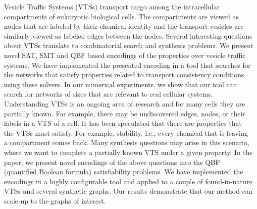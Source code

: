 Vesicle Traffic Systems (VTSs) transport cargo among the intracellular compartments of eukaryotic biological cells.
%
The compartments are viewed as nodes that are labeled by their chemical identity and the transport vesicles are similarly viewed as labeled edges between the nodes.
%
Several interesting questions about VTSs translate to combinatorial search and synthesis problems. 
%
We present novel SAT, SMT and QBF based encodings of the properties over vesicle traffic systems.
%
We have implemented the presented encoding in a tool that searches for the networks that satisfy properties related to transport consistency conditions using these solvers. 
%
In our numerical experiments, we show that our tool can search for networks of sizes that are relevant to real cellular systems.
%
Understanding VTSs is an ongoing area of
research and for many cells they are partially known. 
%
For example, there
may be undiscovered edges, nodes, or their labels in a VTS of a cell. 
%
It has been speculated that there are properties that the VTSs must satisfy.
For example, stability, i.e., every chemical that is leaving a compartment
comes back. 
%
Many synthesis questions may arise in this scenario, where
we want to complete a partially known VTS under a given property.
%
In the paper, we present novel encodings of the above questions into
the QBF (quantified Boolean formula) satisfiability problems. 
%
We have implemented the encodings in a highly configurable tool and applied to a
couple of found-in-nature VTSs and several synthetic graphs.
%
Our results demonstrate that our method can scale up to the graphs of interest.

